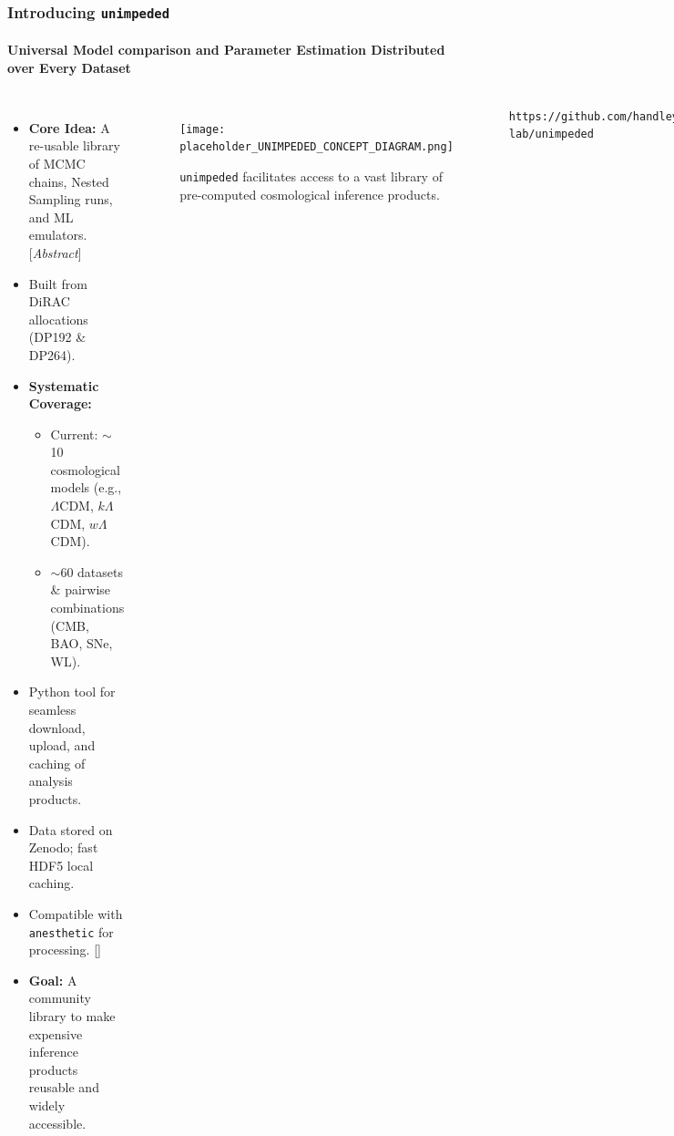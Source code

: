 \documentclass[aspectratio=169]{beamer}
\begin{document}
\begin{frame}
    \frametitle{Introducing \texttt{unimpeded}}
    \framesubtitle{Universal Model comparison and Parameter Estimation Distributed over Every Dataset}
    \begin{columns}[T]
        \begin{itemize}
            \item \textbf{Core Idea:} A re-usable library of MCMC chains, Nested Sampling runs, and ML emulators. [\textit{Abstract}]
            \item Built from DiRAC allocations (DP192 \& DP264).
            \item \textbf{Systematic Coverage:}
                \begin{itemize}
                    \item Current: $\sim$10 cosmological models (e.g., $\Lambda$CDM, $k\Lambda$CDM, $w\Lambda$CDM).
                    \item $\sim$60 datasets \& pairwise combinations (CMB, BAO, SNe, WL).
                \end{itemize}
            \item Python tool for seamless download, upload, and caching of analysis products.
            \item Data stored on Zenodo; fast HDF5 local caching.
            \item Compatible with \texttt{anesthetic} for processing. []
            \item \textbf{Goal:} A community library to make expensive inference products reusable and widely accessible.
        \end{itemize}
        \begin{figure}
            \centering
            \texttt{[image: placeholder\_UNIMPEDED\_CONCEPT\_DIAGRAM.png]}
            \caption{\texttt{unimpeded} facilitates access to a vast library of pre-computed cosmological inference products.}
        \end{figure}
        \texttt{https://github.com/handley-lab/unimpeded}
    \end{columns}
\end{frame}
\end{document}
